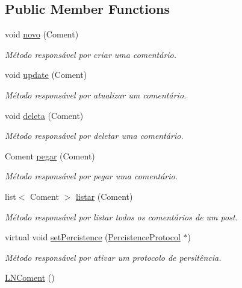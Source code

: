 \subsection*{Public Member Functions}
\begin{DoxyCompactItemize}
\item 
void \hyperlink{class_l_n_coment_a0c4839930f9a6d65f6200845fdab9750}{novo} (Coment)
\begin{DoxyCompactList}\small\item\em Método responsável por criar uma comentário. \end{DoxyCompactList}\item 
void \hyperlink{class_l_n_coment_acefe80ac606f9258093f22eca0759cb0}{update} (Coment)
\begin{DoxyCompactList}\small\item\em Método responsável por atualizar um comentário. \end{DoxyCompactList}\item 
void \hyperlink{class_l_n_coment_abf2ff1565521a03e001ff907eeec7fe9}{deleta} (Coment)
\begin{DoxyCompactList}\small\item\em Método responsável por deletar uma comentário. \end{DoxyCompactList}\item 
Coment \hyperlink{class_l_n_coment_a321fb89a92d2af289267c0ccac1c090f}{pegar} (Coment)
\begin{DoxyCompactList}\small\item\em Método responsável por pegar uma comentário. \end{DoxyCompactList}\item 
list$<$ Coment $>$ \hyperlink{class_l_n_coment_a277bc9cf3aea9deedda7272e7ca737a6}{listar} (Coment)
\begin{DoxyCompactList}\small\item\em Método responsável por listar todos os comentários de um post. \end{DoxyCompactList}\item 
virtual void \hyperlink{class_l_n_coment_abdf75faf2dc51482a09958f78095b008}{set\-Percistence} (\hyperlink{class_percistence_protocol}{Percistence\-Protocol} $\ast$)
\begin{DoxyCompactList}\small\item\em Método responsável por ativar um protocolo de persitência. \end{DoxyCompactList}\item 
\hypertarget{class_l_n_coment_a19bb165b5bd6a9479756cb4057238252}{\hyperlink{class_l_n_coment_a19bb165b5bd6a9479756cb4057238252}{L\-N\-Coment} ()}\label{class_l_n_coment_a19bb165b5bd6a9479756cb4057238252}


\end{DoxyCompactItemize}
